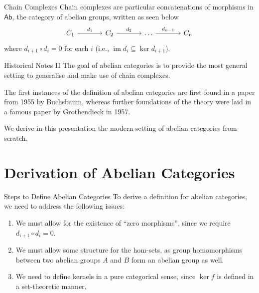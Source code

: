 \documentclass{beamer}
\DeclareMathOperator{\im}{im}
\newcommand{\cat}[1]{\mathsf{#1}}
\begin{document}
\begin{frame}{Chain Complexes}
    Chain complexes are particular concatenations of morphisms in $\cat{Ab}$, the
    category of abelian groups, written as seen below
    \[\begin{tikzcd}[sep=large, ampersand replacement=\&]
        {C_1} \& {C_2} \& \ldots \& {C_n}
        \arrow["{d_1}", from=1-1, to=1-2]
        \arrow["{d_2}", from=1-2, to=1-3]
        \arrow["{d_{n-1}}", from=1-3, to=1-4]
    \end{tikzcd}\]
    where $d_{i+1} \circ d_i = 0$ for each $i$ (i.e., $\im d_i \subseteq \ker d_{i+1}$). \smallskip
\end{frame}

\begin{frame}{Historical Notes II}
    The goal of abelian categories is to provide the most general setting to
    generalise and make use of chain complexes. \medskip
    
    The first instances of the definition of abelian
    categories are first found in a paper from 1955 by Buchsbaum, whereas further
    foundations of the theory were laid in a famous paper by
    Grothendieck in 1957. \medskip

    We derive in this presentation the modern setting of
    abelian categories from scratch.
\end{frame}


\section{Derivation of Abelian Categories}

\begin{frame}{Steps to Define Abelian Categories}
    To derive a definition for
    abelian categories, we need to address the following issues:
    \begin{enumerate}
        \item We must allow for the existence of ``zero morphisms'',
            since we require $d_{i+1} \circ d_i = 0$.
        \item We must allow some structure for the hom-sets, as
            group homomorphisms between two abelian groups $A$ and
            $B$ form an abelian group as well.
        \item We need to define kernels in a pure categorical sense,
            since $\ker f$ is defined in a set-theoretic manner. 
    \end{enumerate}
\end{frame}
\end{document}
